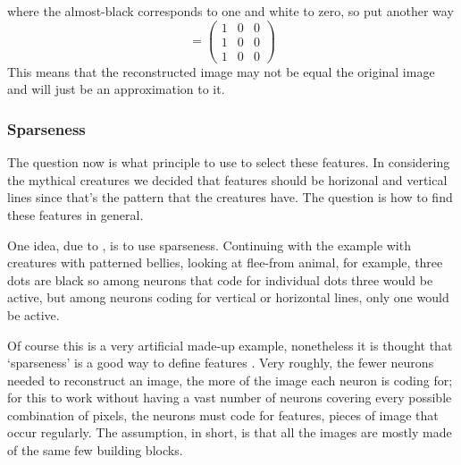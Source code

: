 \documentclass[11pt,a4paper]{scrartcl}
\begin{document}
\begin{center}
\end{center}
where the almost-black corresponds to one and white to zero, so put another way
\begin{equation}
[W^1_{ij}]=\left(\begin{array}{lll}1&0&0\\1&0&0\\1&0&0\end{array}\right)
\end{equation}
This means that the
reconstructed image may not be equal the original image and will just
be an approximation to it. 


\subsubsection*{Sparseness}

The question now is what principle to use to select these features. In
considering the mythical creatures we decided that features should be
horizonal and vertical lines since that's the pattern that the
creatures have. The question is how to find these features in general.


One idea, due to \cite{OlshausenField1996a,OlshausenField1997a}, is to
use sparseness. Continuing with the example with creatures with patterned
bellies, looking at flee-from animal, for example, three dots are
black so among neurons that code for individual dots three would be
active, but among neurons coding for vertical or horizontal lines,
only one would be active.

Of course this is a very artificial made-up example, nonetheless it is
thought that \lq{}sparseness\rq{} is a good way to define features
\cite{OlshausenField1996a,OlshausenField1997a}. Very roughly, the
fewer neurons needed to reconstruct an image, the more of the image
each neuron is coding for; for this to work without having a vast
number of neurons covering every possible combination of pixels, the
neurons must code for features, pieces of image that occur
regularly. The assumption, in short, is that all the images are mostly
made of the same few building blocks.
\end{document}
